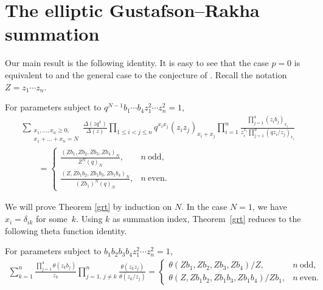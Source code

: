 \section{The elliptic Gustafson--Rakha summation}\label{ms}

Our main result is the following identity. It is easy to see that the case $p=0$ is equivalent to \cite[Theorem~1.2]{gr} and the general case to the conjecture of \cite[p.~953]{sp}. Recall the notation $Z=z_1\dotsm z_n$.

\begin{Theorem}\label{grt}
For parameters subject to $q^{N-1}b_1\dotsm b_4z_1^2\dotsm z_n^2=1$,
\begin{gather}\sum_{\substack{x_1,\dots,x_n\geq 0,\\x_1+\dots+x_n=N}}
\frac{\Delta(zq^x)}{\Delta(z)}\prod\limits_{1\leq i<j\leq n}q^{x_ix_j}(z_iz_j)_{x_i+x_j}\prod\limits_{i=1}^n
\frac{\prod\limits_{j=1}^4(z_ib_j)_{x_i}}{z_i^{x_i}\prod\limits_{j=1}^n(qz_i/z_j)_{x_i}}\nonumber\\
\qquad{} =\begin{cases}
\displaystyle\frac{(Zb_1,Zb_2,Zb_3,Zb_4)_N}{Z^N(q)_N}, & n~\text{odd},\\[4mm]
\displaystyle\frac{(Z,Zb_1b_2,Zb_1b_3,Zb_1b_4)_N}{(Zb_1)^N(q)_N}, & n~\text{even}.
\end{cases}\label{gri}
\end{gather}
\end{Theorem}

We will prove Theorem \ref{grt} by induction on $N$. In the case $N=1$, we have $x_i=\delta_{ik}$ for some~$k$. Using $k$ as summation index,
Theorem~\ref{grt} reduces to the following theta function identity.

\begin{Lemma}
For parameters subject to $b_1b_2b_3b_4z_1^2\dotsm z_n^2=1$,
\begin{gather}\label{ib}\sum_{k=1}^n\frac{\prod\limits_{j=1}^4\theta(z_kb_j)}{z_k}\prod\limits_{j=1,\,j\neq k}^n\frac{\theta(z_kz_j)}{\theta(z_k/z_j)}
=\begin{cases}
\theta(Zb_1,Zb_2,Zb_3,Zb_4)/Z, & n~\text{odd},\\
\theta(Z,Zb_1b_2,Zb_1b_3,Zb_1b_4)/Zb_1, & n~\text{even}.
 \end{cases} \end{gather}
\end{Lemma}

